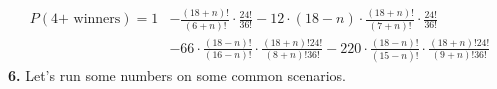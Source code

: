 \documentclass[11pt]{article}
\begin{document}
\begin {equation}
  \begin{aligned}
    P(4 \text{+ winners})=1&-\frac{(18+n)!}{(6+n)!}\cdot \frac{24!}{36!} -12\cdot (18-n)\cdot \frac{(18+n)!}{(7+n)!}\cdot \frac{24!}{36!}\\
    & -66 \cdot \frac{(18-n)!}{(16-n)!}\cdot \frac{(18+n)!24!}{(8+n)!36!}  - 220\cdot \frac{(18-n)!}{(15-n)!}\cdot \frac{(18+n)!24!}{(9+n)!36!}
\end{aligned}
\end{equation}
\textbf{6.} Let's run some numbers on some common scenarios. 
\end{document}
